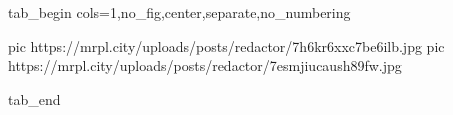 
 
 
 
 


\ifcmt
  tab_begin cols=1,no_fig,center,separate,no_numbering

     pic https://mrpl.city/uploads/posts/redactor/7h6kr6xxc7be6ilb.jpg
		 pic https://mrpl.city/uploads/posts/redactor/7esmjiucaush89fw.jpg

  tab_end
\fi
